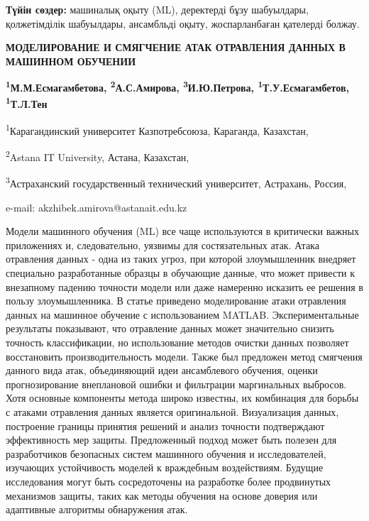 {\bfseries Түйін сөздер:} машиналық оқыту (ML), деректерді бұзу шабуылдары,
қолжетімділік шабуылдары, ансамбльді оқыту, жоспарланбаған қателерді
болжау.

\begin{articleheader}
{\bfseries МОДЕЛИРОВАНИЕ И СМЯГЧЕНИЕ АТАК ОТРАВЛЕНИЯ ДАННЫХ В МАШИННОМ ОБУЧЕНИИ}

{\bfseries
\textsuperscript{1}М.М.Есмагамбетова,
\textsuperscript{2}А.С.Амирова\textsuperscript{\envelope },
\textsuperscript{3}И.Ю.Петрова,
\textsuperscript{1}Т.У.Есмагамбетов,
\textsuperscript{1}Т.Л.Тен
}
\end{articleheader}

\begin{affiliation}
\textsuperscript{1}Карагандинский университет Казпотребсоюза, Караганда, Казахстан,

\textsuperscript{2}Astana IT University, Астана, Казахстан,

\textsuperscript{3}Астраханский государственный технический университет, Астрахань, Россия,

e-mail: akzhibek.amirova@astanait.edu.kz
\end{affiliation}

Модели машинного обучения (ML) все чаще используются в критически важных
приложениях и, следовательно, уязвимы для состязательных атак. Атака
отравления данных - одна из таких угроз, при которой злоумышленник
внедряет специально разработанные образцы в обучающие данные, что может
привести к внезапному падению точности модели или даже намеренно
исказить ее решения в пользу злоумышленника. В статье приведено
моделирование атаки отравления данных на машинное обучение с
использованием MATLAB. Экспериментальные результаты показывают, что
отравление данных может значительно снизить точность классификации, но
использование методов очистки данных позволяет восстановить
производительность модели. Также был предложен метод смягчения данного
вида атак, объединяющий идеи ансамблевого обучения, оценки
прогнозирование внеплановой ошибки и фильтрации маргинальных выбросов.
Хотя основные компоненты метода широко известны, их комбинация для
борьбы с атаками отравления данных является оригинальной. Визуализация
данных, построение границы принятия решений и анализ точности
подтверждают эффективность мер защиты. Предложенный подход может быть
полезен для разработчиков безопасных систем машинного обучения и
исследователей, изучающих устойчивость моделей к враждебным
воздействиям. Будущие исследования могут быть сосредоточены на
разработке более продвинутых механизмов защиты, таких как методы
обучения на основе доверия или адаптивные алгоритмы обнаружения атак.

